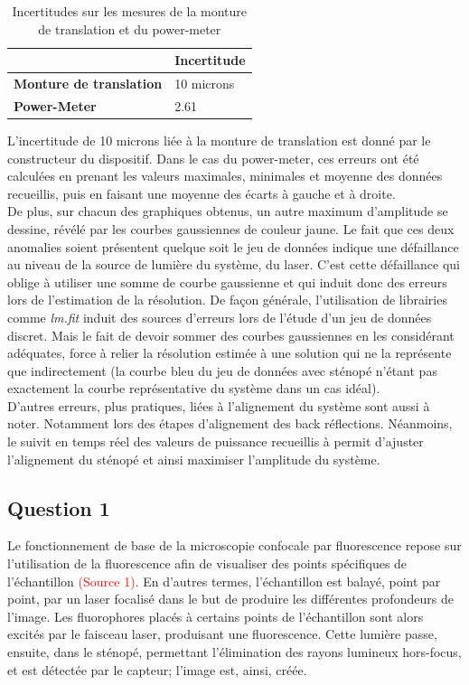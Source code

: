 \documentclass[11pt,letterpaper]{article}
\begin{document}
\begin{table}[H]
\centering
\begin{tabular}{|p{4.8cm}|p{4.2cm}|}
\cline{2-2}
\multicolumn{1}{c|}{} & \textbf{Incertitude} \\
\hline
\textbf{Monture de translation} & 10 microns\\
\hline
\textbf{Power-Meter} & 2.61\\
\hline
\end{tabular}
\caption{Incertitudes sur les mesures de la monture de translation et du power-meter}
\label{incertitudes}
\end{table}

L'incertitude de 10 microns liée à la monture de translation est donné par le constructeur du dispositif. Dans le cas du power-meter, ces erreurs ont été calculées en prenant les valeurs maximales, minimales et moyenne des données recueillis, puis en faisant une moyenne des écarts à gauche et à droite. \\

De plus, sur chacun des graphiques obtenus, un autre maximum d'amplitude se dessine, révélé par les courbes gaussiennes de couleur jaune. Le fait que ces deux anomalies soient présentent quelque soit le jeu de données indique une défaillance au niveau de la source de lumière du système, du laser. C'est cette défaillance qui oblige à utiliser une somme de courbe gaussienne et qui induit donc des erreurs lors de l'estimation de la résolution. De façon générale, l'utilisation de librairies comme \textit{lm.fit} induit des sources d'erreurs lors de l'étude d'un jeu de données discret. Mais le fait de devoir sommer des courbes gaussiennes en les considérant adéquates, force à relier la résolution estimée à une solution qui ne la représente que indirectement (la courbe bleu du jeu de données avec sténopé n'étant pas exactement la courbe représentative du système dans un cas idéal).\\

D'autres erreurs, plus pratiques, liées à l'alignement du système sont aussi à noter. Notamment lors des étapes d'alignement des back réflections. Néanmoins, le suivit en temps réel des valeurs de puissance recueillis à permit d'ajuster l'alignement du sténopé et ainsi maximiser l'amplitude du système. 

\subsection{Question 1}
Le fonctionnement de base de la microscopie confocale par fluorescence repose sur l'utilisation de la fluorescence afin de visualiser des points spécifiques de l'échantillon \textcolor{red}{(Source 1)}. En d'autres termes, l'échantillon est balayé, point par point, par un laser focalisé dans le but de produire les différentes profondeurs de l'image. Les fluorophores placés à certains points de l'échantillon sont alors excités par le faisceau laser, produisant une fluorescence. Cette lumière passe, ensuite, dans le sténopé, permettant l'élimination des rayons lumineux hors-focus, et est détectée par le capteur; l'image est, ainsi, créée.
\end{document}
